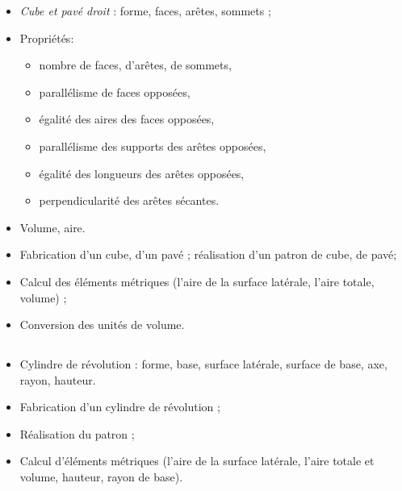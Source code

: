\savoir
\begin{itemize}
\item \textit{Cube et pavé droit} : forme, faces, arêtes, sommets ;
\item Propriétés:
\begin{itemize}
\item nombre de faces, d'arêtes, de sommets,
\item parallélisme de faces opposées, 
\item égalité des aires des faces opposées,
\item parallélisme des supports des arêtes opposées,
\item égalité des longueurs des arêtes opposées, 
\item perpendicularité des arêtes sécantes.
\end{itemize}
\item Volume, aire.
\end{itemize}
\savoirfaire
\begin{itemize}
\item Fabrication d'un cube, d'un pavé ; réalisation d'un patron de cube, de pavé;
\item Calcul des éléments métriques (l'aire de la surface latérale, l'aire
totale, volume) ;
\item Conversion des unités de volume.
\end{itemize}

\subsection*{}

\savoir
\begin{itemize}
\item Cylindre de révolution : forme, base, surface latérale, surface de base, axe, rayon, hauteur.
\end{itemize}
\savoirfaire
\begin{itemize}
\item Fabrication d'un cylindre de révolution ;
\item Réalisation du patron ;
\item Calcul d'éléments métriques (l'aire de la surface latérale, l'aire totale et volume, hauteur, rayon de base).
\end{itemize}